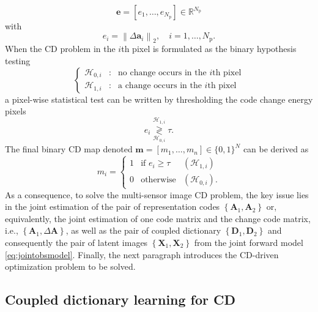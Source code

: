 \documentclass[review]{elsarticle}
\newcommand{\Npatch}{N_{\mathrm{p}}}
\begin{document}
%
\begin{equation}
\label{eq:change_energy_matrix}
  \mathbf{e} =\left[e_1,\ldots,e_{\Npatch}\right]\in \mathbb{R}^{\Npatch}
\end{equation}
%
with
%
\begin{equation*}
  e_i = \left\|\Delta\mathbf{a}_i\right\|_2, \quad i=1,\ldots,\Npatch.
\end{equation*}
%
When the CD problem in the $i$th pixel is formulated as the binary hypothesis testing
%
\begin{equation*}
\label{eq:test}
 \left\{
		\begin{array}{rcl}
			\mathcal{H}_{0,i} &:& \text{no change occurs in the $i$th pixel}  \\
			\mathcal{H}_{1,i} &:& \text{a change occurs in the $i$th pixel}
		\end{array}
        \right.
\end{equation*}
%
a pixel-wise statistical test can be written by thresholding the code change energy pixels
%
\begin{equation*}
    \label{eq:decision_rule}
  e_i \overset{\mathcal{H}_{1,i}}{\underset{\mathcal{H}_{0,i}}{\gtrless}} \tau.
\end{equation*}
%
The final binary CD map denoted ${\mathbf{m}} = \left[m_1,\ldots,m_n\right] \in \{0,1\}^N$ can be derived as
%
\begin{equation*}
	\label{eq:CVArule}
 {m}_i = \left\{\begin{array}{lll}
             1 & \mbox{if } e_i \geq \tau & (\mathcal{H}_{1,i})\\
			 0 & \mbox{otherwise}          & (\mathcal{H}_{0,i}).
				\end{array}\right.
\end{equation*}
%
As a consequence, to solve the multi-sensor image CD problem, the key issue lies in the joint estimation of the pair of representation codes $\left\{\mathbf{A}_{1},\mathbf{A}_{2}\right\}$ or, equivalently, the joint estimation of one code matrix and the change code matrix, i.e., $\left\{\mathbf{A}_{1},\Delta\mathbf{A}\right\}$, as well as the pair of coupled dictionary $\left\{\mathbf{D}_{1},\mathbf{D}_{2}\right\}$ and consequently the pair of latent images $\left\{\mathbf{X}_{1},\mathbf{X}_{2}\right\}$ from the joint forward model \eqref{eq:jointobsmodel}. Finally, the next paragraph introduces the CD-driven optimization problem to be solved.



\subsection{Coupled dictionary learning for CD}
\label{subsec:cdl}
\end{document}

